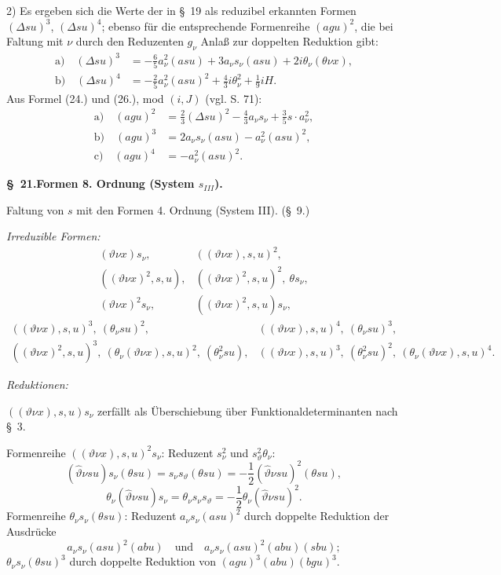 \documentclass[11pt]{article}
\newcommand{\A}{\Delta}
\begin{document}
2) Es ergeben sich die Werte der in \S\ 19 als reduzibel erkannten Formen $(\A su)^3$, $(\A su)^4$; ebenso für die entsprechende Formenreihe $(agu)^2$, die bei Faltung mit $\nu$ durch den Reduzenten $g_\nu$ Anlaß zur doppelten Reduktion gibt:
\[
\tag{26}
\begin{aligned}
\text{a)}\quad (\A su)^3&=-\frac65a_\nu^2(asu)+3a_\nu s_\nu(asu)+2i\theta_\nu(\theta\nu x),\\
\text{b)}\quad (\A su)^4&=-\frac25a_\nu^2(asu)^2+\frac43i\theta_\nu^2+\frac19iH.
\end{aligned}
\]
Aus Formel (24.) und (26.), mod $(i,J)$ (vgl. S. 71):
\[
\tag{27}
\begin{aligned}
\text{a)}\quad (agu)^2&=\frac23(\A su)^2-\frac43a_\nu s_\nu+\frac35s\cdot a_\nu^2,\\
\text{b)}\quad (agu)^3&=2a_\nu s_\nu(asu)-a_\nu^2(asu)^2,\\
\text{c)}\quad (agu)^4&=-a_\nu^2(asu)^2.
\end{aligned}
\]


\begin{center}
\textbf{\S\ 21.\quad Formen 8. Ordnung (System $s_{III}$).}
\end{center}

Faltung von $s$ mit den Formen 4. Ordnung (System III). (\S\ 9.)

\noindent\emph{Irreduzible Formen:}
\[
\begin{array}{lll}
(\vartheta\nu x)s_\nu,& ((\vartheta\nu x),s,u)^2,\\[-0.1em]
((\vartheta\nu x)^2,s,u),& ((\vartheta\nu x)^2,s,u)^2,\ \theta s_\nu,\\[-0.1em]
(\vartheta\nu x)^2s_\nu,& ((\vartheta\nu x)^2,s,u)s_\nu,
\end{array}
\]
\[
\begin{array}{lll}
((\vartheta\nu x),s,u)^3,\ (\theta_\nu su)^2,&
((\vartheta\nu x),s,u)^4,\ (\theta_\nu su)^3,\\[-0.1em]
((\vartheta\nu x)^2,s,u)^3,\ (\theta_\nu(\vartheta\nu x),s,u)^2,\ (\theta_\nu^2su),&
((\vartheta\nu x),s,u)^3,\ (\theta_\nu^2su)^2,\ (\theta_\nu(\vartheta\nu x),s,u)^4.
\end{array}
\]

\noindent\emph{Reduktionen:}

$((\vartheta\nu x),s,u)s_\nu$ zerfällt als Überschiebung über Funktionaldeterminanten nach \S\ 3.

Formenreihe $((\vartheta\nu x),s,u)^2s_\nu$: Reduzent $s_\nu^2$ und $s_\vartheta^2\theta_\nu$:
\[
(\widehat\vartheta\nu su)s_\nu(\theta su)=s_\nu s_\vartheta(\theta su)=-\frac12(\widehat\vartheta\nu su)^2(\theta su),
\]
\[
\theta_\nu(\widehat\vartheta\nu su)s_\nu=\theta_\nu s_\nu s_\vartheta=-\frac12\theta_\nu(\widehat\vartheta\nu su)^2.
\]
Formenreihe $\theta_\nu s_\nu(\theta su)$: Reduzent $a_\nu s_\nu(asu)^2$ durch doppelte Reduktion der Ausdrücke
\[
a_\nu s_\nu(asu)^2(abu)\quad\text{und}\quad a_\nu s_\nu(asu)^2(abu)(sbu);
\]
$\theta_\nu s_\nu(\theta su)^3$ durch doppelte Reduktion von $(agu)^3(abu)(bgu)^3$.
\end{document}
